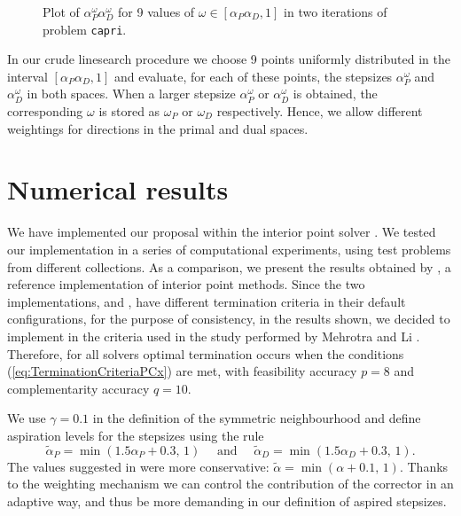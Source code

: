 \begin{figure}[ht]
\begin{minipage}[t]{0.49\textwidth}
  \end{minipage}
  \caption{Plot of $\alpha^\omega_P\alpha^\omega_D$ for 9 values 
           of $\omega \in [\alpha_P\alpha_D, 1]$
           in two iterations of problem {\tt capri}.}
  \label{fig:alphaomega}
\end{figure}

In our crude linesearch procedure we choose 9 points uniformly 
distributed in the interval $[\alpha_P\alpha_D, 1]$ 
and evaluate, for each of these points, the stepsizes 
$\alpha^\omega_P$ and $\alpha^\omega_D$ in both spaces. 
When a larger stepsize $\alpha^\omega_P$ or $\alpha^\omega_D$ is obtained, 
the corresponding $\omega$ is stored as $\omega_P$ or $\omega_D$ 
respectively. Hence, we allow different weightings for directions 
in the primal and dual spaces.

%
%
\section{Numerical results}
\label{sec:NumericalResults}

We have implemented our proposal within the \HOPDM interior point solver 
\cite{HOPDM}. 
%
%
We tested our implementation in a series of computational 
experiments, using test problems from different collections. 
As a comparison, we present the results obtained by \PCx \cite{PCx}, 
a reference implementation of interior point methods. Since the two 
implementations, \PCx and \HOPDM, have different termination criteria 
in their default configurations, for the purpose of consistency,
in the results shown, 
we decided to implement in \HOPDM the criteria used in the study 
performed by Mehrotra and Li \cite{MehrotraLi}.
Therefore, for all solvers optimal termination occurs when the conditions
(\ref{eq:TerminationCriteriaPCx}) are met, with feasibility
accuracy $p=8$ and complementarity accuracy $q = 10$.

We use $\gamma = 0.1$ in the definition of the symmetric 
neighbourhood and define aspiration levels for the stepsizes using the rule
\[
  \tilde{\alpha}_{P} = \min(1.5 \alpha_{P} \! + \! 0.3, \, 1) 
  \quad \mbox{ and } \quad
  \tilde{\alpha}_{D} = \min(1.5 \alpha_{D} \! + \! 0.3, \, 1). 
\]
The values suggested in \cite{Gondzio96} were more conservative:
$\tilde{\alpha} = \min (\alpha + 0.1, \, 1)$.
Thanks to the weighting mechanism we can control 
the contribution of the corrector in an adaptive way,
and thus be more demanding in our definition of aspired stepsizes.

